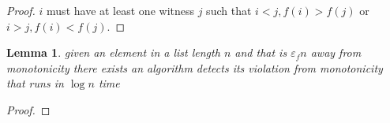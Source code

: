 \documentclass{article}
\newtheorem{lemma}[theorem]{Lemma}
\begin{document}
\begin{proof}
    \(i\) must have at least one witness \(j\) such that \(i<j, f(i)> f(j)\) or \(i>j, f(i)<f(j )\).  
\end{proof}

\begin{lemma}
    given an element in a list length \(n\) and that is \(\varepsilon_f n\) away from monotonicity there exists an algorithm detects its violation from monotonicity that runs in \(\log n\) time
\end{lemma}
\begin{proof}
    
\end{proof}
\end{document}
